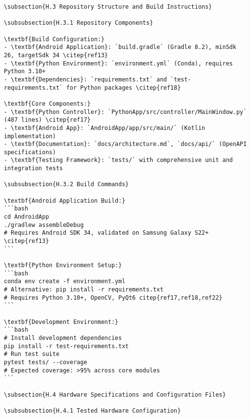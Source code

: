 \begin{verbatim}
\subsection{H.3 Repository Structure and Build Instructions}

\subsubsection{H.3.1 Repository Components}

\textbf{Build Configuration:}
- \textbf{Android Application}: `build.gradle` (Gradle 8.2), minSdk 26, targetSdk 34 \citep{ref13}
- \textbf{Python Environment}: `environment.yml` (Conda), requires Python 3.10+
- \textbf{Dependencies}: `requirements.txt` and `test-requirements.txt` for Python packages \citep{ref18}

\textbf{Core Components:}
- \textbf{Python Controller}: `PythonApp/src/controller/MainWindow.py` (487 lines) \citep{ref17}
- \textbf{Android App}: `AndroidApp/app/src/main/` (Kotlin implementation)
- \textbf{Documentation}: `docs/architecture.md`, `docs/api/` (OpenAPI specifications)
- \textbf{Testing Framework}: `tests/` with comprehensive unit and integration tests

\subsubsection{H.3.2 Build Commands}

\textbf{Android Application Build:}
```bash
cd AndroidApp
./gradlew assembleDebug
# Requires Android SDK 34, validated on Samsung Galaxy S22+ \citep{ref13}
```

\textbf{Python Environment Setup:}
```bash
conda env create -f environment.yml
# Alternative: pip install -r requirements.txt
# Requires Python 3.10+, OpenCV, PyQt6 citep{ref17,ref18,ref22}
```

\textbf{Development Environment:}
```bash
# Install development dependencies
pip install -r test-requirements.txt
# Run test suite
pytest tests/ --coverage
# Expected coverage: >95% across core modules
```

\subsection{H.4 Hardware Specifications and Configuration Files}

\subsubsection{H.4.1 Tested Hardware Configuration}


\end{verbatim}
